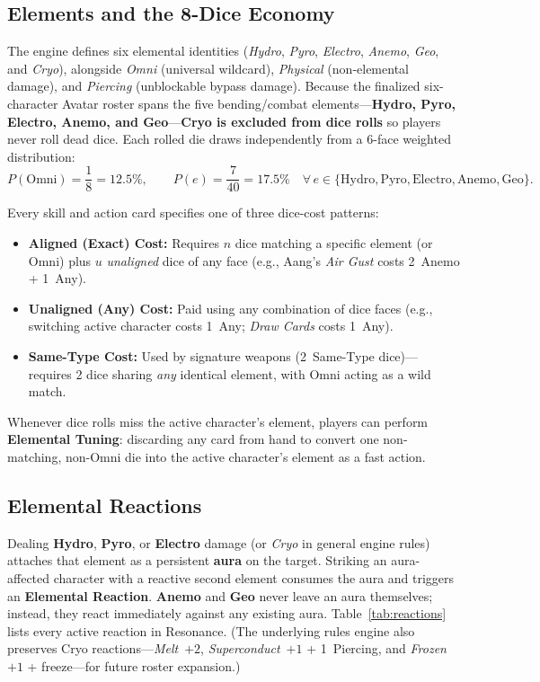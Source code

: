 \documentclass[11pt,a4paper]{article}
\begin{document}
\subsection{Elements and the 8-Dice Economy}

The engine defines six elemental identities (\emph{Hydro}, \emph{Pyro}, \emph{Electro}, \emph{Anemo}, \emph{Geo}, and \emph{Cryo}), alongside \emph{Omni} (universal wildcard), \emph{Physical} (non-elemental damage), and \emph{Piercing} (unblockable bypass damage). Because the finalized six-character Avatar roster spans the five bending/combat elements—\textbf{Hydro, Pyro, Electro, Anemo, and Geo}—\textbf{Cryo is excluded from dice rolls} so players never roll dead dice. Each rolled die draws independently from a 6-face weighted distribution:
\begin{equation}
  P(\text{Omni}) = \frac{1}{8} = 12.5\%, \qquad
  P(e) = \frac{7}{40} = 17.5\% \quad \forall\, e \in \{\text{Hydro}, \text{Pyro}, \text{Electro}, \text{Anemo}, \text{Geo}\}.
\end{equation}

Every skill and action card specifies one of three dice-cost patterns:
\begin{itemize}[leftmargin=1.4em, itemsep=2pt]
  \item \textbf{Aligned (Exact) Cost:} Requires $n$ dice matching a specific element (or Omni) plus $u$ \emph{unaligned} dice of any face (e.g., Aang's \emph{Air Gust} costs 2~Anemo + 1~Any).
  \item \textbf{Unaligned (Any) Cost:} Paid using any combination of dice faces (e.g., switching active character costs 1~Any; \emph{Draw Cards} costs 1~Any).
  \item \textbf{Same-Type Cost:} Used by signature weapons (2~Same-Type dice)—requires 2 dice sharing \emph{any} identical element, with Omni acting as a wild match.
\end{itemize}
Whenever dice rolls miss the active character's element, players can perform \textbf{Elemental Tuning}: discarding any card from hand to convert one non-matching, non-Omni die into the active character's element as a fast action.

\subsection{Elemental Reactions}

Dealing \textbf{Hydro}, \textbf{Pyro}, or \textbf{Electro} damage (or \emph{Cryo} in general engine rules) attaches that element as a persistent \textbf{aura} on the target. Striking an aura-affected character with a reactive second element consumes the aura and triggers an \textbf{Elemental Reaction}. \textbf{Anemo} and \textbf{Geo} never leave an aura themselves; instead, they react immediately against any existing aura. Table~\ref{tab:reactions} lists every active reaction in Resonance. (The underlying rules engine also preserves Cryo reactions—\emph{Melt}~$+2$, \emph{Superconduct}~$+1$ + 1~Piercing, and \emph{Frozen}~$+1$ + freeze—for future roster expansion.)
\end{document}
